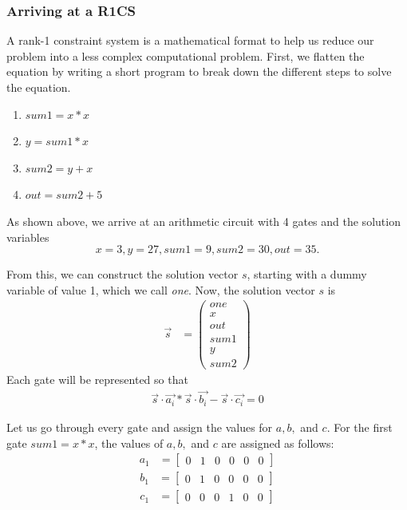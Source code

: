 \subsubsection{Arriving at a R1CS}

A rank-1 constraint system is a mathematical format to help us reduce our problem into a less complex computational problem. First, we flatten the equation by writing a short program to break down the different steps to solve the equation.

\begin{enumerate}
    \item \(sum1 = x * x\)
    \item \(y = sum1 * x\)
    \item \(sum2 = y + x\)
    \item \(out = sum2 + 5\)
\end{enumerate}

As shown above, we arrive at an arithmetic circuit with 4 gates and the solution variables
\[x = 3, y = 27, sum1 = 9, sum2 = 30, out = 35.\]

From this, we can construct the solution vector \(s\), starting with a dummy variable of value 1, which we call \textit{one}.
Now, the solution vector \(s\) is
\begin{align}
    \Vec{s} &= \begin{pmatrix}
     one \\ x \\ out \\ sum1 \\ y \\ sum2
\end{pmatrix}
\end{align}
Each gate will be represented so that
\begin{align}
     \Vec{s}\cdot\Vec{a_i} * \Vec{s}\cdot\Vec{b_i} - \Vec{s}\cdot\Vec{c_i} = 0
\end{align}

Let us go through every gate and assign the values for \(a, b,\) and \(c\).
For the first gate \(sum1 = x*x\), the values of \(a, b,\) and \(c\) are assigned as follows:
\begin{align*}
    a_1 &=\begin{bmatrix}
        0 & 1 & 0 & 0 & 0 & 0
    \end{bmatrix}
\end{align*}
\begin{align*}
    b_1&=\begin{bmatrix}
        0 & 1 & 0 & 0 & 0 & 0 
    \end{bmatrix}
\end{align*}
\begin{align*}
    c_1&=\begin{bmatrix}
        0 & 0 & 0 & 1 & 0 & 0
    \end{bmatrix}
\end{align*}

